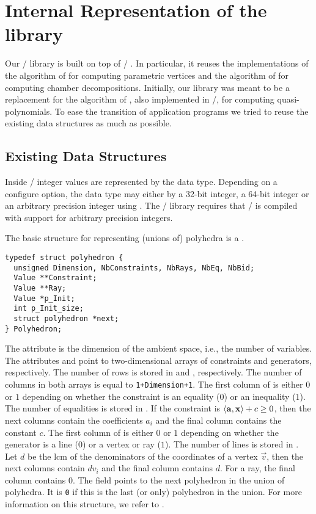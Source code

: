 \section{Internal Representation of the \protect{} library}

Our \barvinok/ library is built on top of \PolyLib/ 
.
In particular, it reuses the implementations
of the algorithm of 
for computing parametric vertices
and the algorithm of
for computing chamber decompositions.
Initially, our library was meant to be a replacement
for the algorithm of ,
also implemented in \PolyLib/, for computing quasi-polynomials.
To ease the transition of application programs we
tried to reuse the existing data structures as much as possible.

\subsection{Existing Data Structures}
\label{a:existing}

Inside \PolyLib/ integer values are represented by the 
 data type.
Depending on a configure option, the data type may
either by a 32-bit integer, a 64-bit integer
or an arbitrary precision integer using .
The \barvinok/ library requires that \PolyLib/ is compiled
with support for arbitrary precision integers.

The basic structure for representing (unions of) polyhedra is a
.
\begin{verbatim}
typedef struct polyhedron {
  unsigned Dimension, NbConstraints, NbRays, NbEq, NbBid;
  Value **Constraint;
  Value **Ray;
  Value *p_Init;
  int p_Init_size;
  struct polyhedron *next;
} Polyhedron;
\end{verbatim}
The attribute  is the dimension
of the ambient space, i.e., the number of variables.
The attributes 
and  point to two-dimensional arrays
of constraints and generators, respectively.
The number of rows is stored in
 and
, respectively.
The number of columns in both arrays is equal
to \verb!1+Dimension+1!.
The first column of  is either
$0$ or $1$ depending on whether the constraint 
is an equality ($0$) or an inequality ($1$).
The number of equalities is stored in .
If the constraint is $\sp a x + c \ge 0$, then
the next columns contain the coefficients $a_i$
and the final column contains the constant $c$.
The first column of  is either
$0$ or $1$ depending on whether the generator 
is a line ($0$) or a vertex or ray ($1$).
The number of lines is stored in .
Let $d$ be the \ac{lcm} of the denominators of the coordinates
of a vertex $\vec v$, then the next columns contain
$d v_i$ and the final column contains $d$.
For a ray, the final column contains $0$.
The field  points to the next polyhedron in
the union of polyhedra.
It is \verb+0+ if this is the last (or only) polyhedron in the union.
For more information on this structure, we refer to .

